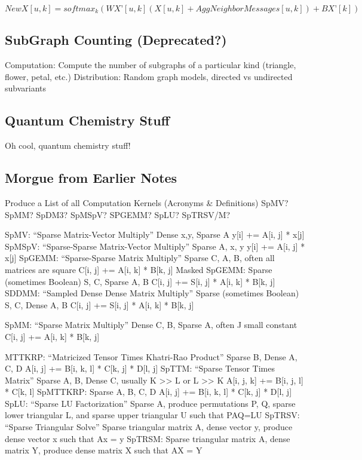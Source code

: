 \documentclass{article}
\begin{document}
$NewX[u, k] = softmax_k(WX’[u,k](X[u, k] +AggNeighborMessages[u,k]) + BX’[k]) $

\subsection{SubGraph Counting (Deprecated?)}
	Computation: Compute the number of subgraphs of a particular kind (triangle, flower, petal, etc.)
	Distribution: Random graph models, directed vs undirected subvariants


\subsection{Quantum Chemistry Stuff}
Oh cool, quantum chemistry stuff!

\subsection{Morgue from Earlier Notes}

Produce a List of all Computation Kernels (Acronyms \& Definitions)
SpMV? SpMM? SpDM3? SpMSpV? SPGEMM? SpLU? SpTRSV/M?

SpMV:
	“Sparse Matrix-Vector Multiply”
Dense x,y, Sparse A
y[i] += A[i, j] * x[j]
SpMSpV:
	“Sparse-Sparse Matrix-Vector Multiply”
Sparse A, x, y
y[i] += A[i, j] * x[j]
SpGEMM:
	“Sparse-Sparse Matrix Multiply”
Sparse C, A, B, often all matrices are square
C[i, j] += A[i, k] * B[k, j]
Masked SpGEMM:
	Sparse (sometimes Boolean) S, C, Sparse A, B
C[i, j] += S[i, j] * A[i, k] * B[k, j]
SDDMM:
	“Sampled Dense Dense Matrix Multiply”
	Sparse (sometimes Boolean) S, C, Dense A, B
C[i, j] += S[i, j] * A[i, k] * B[k, j]

SpMM:
	“Sparse Matrix Multiply”
Dense C, B, Sparse A, often J small constant
C[i, j] += A[i, k] * B[k, j]

MTTKRP:
	“Matricized Tensor Times Khatri-Rao Product”
Sparse B, Dense A, C, D
A[i, j] += B[i, k, l] * C[k, j] * D[l, j]
SpTTM:
	“Sparse Tensor Times Matrix”
Sparse A, B, Dense C, usually K >> L or L >> K
A[i, j, k] += B[i, j, l] * C[k, l]
SpMTTKRP:
Sparse A, B, C, D
A[i, j] += B[i, k, l] * C[k, j] * D[l, j]
SpLU:
	“Sparse LU Factorization”
Sparse A, produce permutations P, Q, sparse lower triangular L, and sparse upper triangular U
such that PAQ=LU
SpTRSV:
	“Sparse Triangular Solve”
	Sparse triangular matrix A, dense vector y, produce dense vector x such that Ax = y
SpTRSM:
	Sparse triangular matrix A, dense matrix Y, produce dense matrix X such that AX = Y
\end{document}
